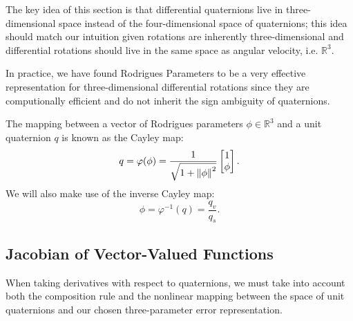 \documentclass[letterpaper, 10 pt, conference]{ieeeconf}  %
\newcommand{\R}{\mathbb{R}}
\newcommand{\Q}{\mathbb{S}^3}
\begin{document}
    The key idea of this section is that differential quaternions live in
    three-dimensional space instead of the four-dimensional space of quaternions; this
    idea should match our intuition given rotations are inherently three-dimensional and
    differential rotations should live in the same space as angular velocity, i.e.
    $\R^3$.

    In practice, we have found Rodrigues Parameters to be a very effective representation
    for three-dimensional differential rotations since they are computionally efficient
    and do not inherit the sign ambiguity of quaternions.
    
    The mapping between a vector of Rodrigues parameters $\phi \in \R^3$ and a unit
    quaternion $q$ is known as the Cayley map:
    \begin{equation} \label{eq:cayley}
        q = \varphi(\phi) = \frac{1}{\sqrt{1 + \norm{\phi}^2}} \begin{bmatrix} 1 \\ \phi \end{bmatrix}.
    \end{equation}
    We will also make use of the inverse Cayley map:
    \begin{equation} \label{eq:invcayley}
        \phi = \varphi^{-1}(q) = \frac{q_v}{q_s}.
    \end{equation}

    \subsection{Jacobian of Vector-Valued Functions}
        When taking derivatives with respect to quaternions, we must take into account
        both the composition rule and the nonlinear mapping between the space of unit
        quaternions and our chosen three-parameter error representation.
\end{document}
